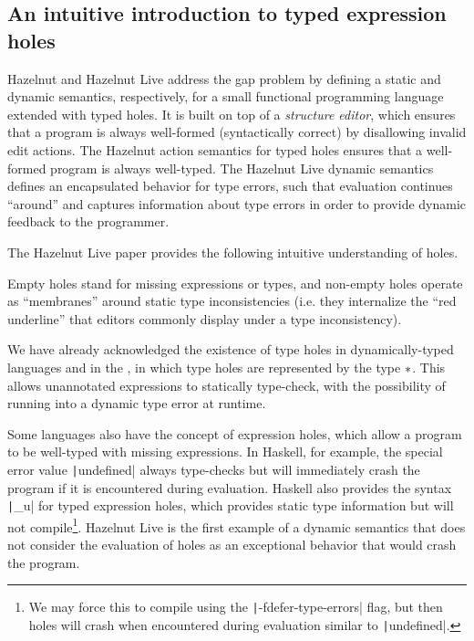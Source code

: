 \subsection{An intuitive introduction to typed expression holes}
\label{sec:typed-holes}

Hazelnut and Hazelnut Live address the gap problem by defining a static and dynamic semantics, respectively, for a small functional programming language extended with typed holes. It is built on top of a \textit{structure editor}, which ensures that a program is always well-formed (syntactically correct) by disallowing invalid edit actions. The Hazelnut action semantics for typed holes ensures that a well-formed program is always well-typed. The Hazelnut Live dynamic semantics defines an encapsulated behavior for type errors, such that evaluation continues ``around'' and captures information about type errors in order to provide dynamic feedback to the programmer.

The Hazelnut Live paper provides the following intuitive understanding of holes.

\begin{displayquote}
  Empty holes stand for missing expressions or types, and non-empty holes operate as ``membranes''
around static type inconsistencies (i.e. they internalize the ``red underline'' that editors commonly display under a type inconsistency).
\end{displayquote}

We have already acknowledged the existence of type holes in dynamically-typed languages and in the \gtclc{}, in which type holes are represented by the type $*$. This allows unannotated expressions to statically type-check, with the possibility of running into a dynamic type error at runtime.

Some languages also have the concept of expression holes, which allow a program to be well-typed with missing expressions. In Haskell, for example, the special error value \texttt|undefined| always type-checks but will immediately crash the program if it is encountered during evaluation. Haskell also provides the syntax \texttt|_u| for typed expression holes, which provides static type information but will not compile\footnote{We may force this to compile using the \texttt|-fdefer-type-errors| flag, but then holes will crash when encountered during evaluation similar to \texttt|undefined|.}. Hazelnut Live is the first example of a dynamic semantics that does not consider the evaluation of holes as an exceptional behavior that would crash the program.

